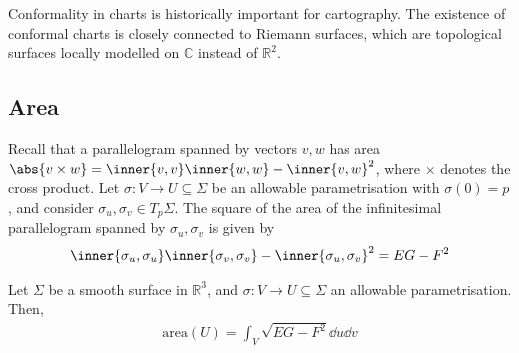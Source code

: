\begin{remark}
	Conformality in charts is historically important for cartography.
	The existence of conformal charts is closely connected to Riemann surfaces, which are topological surfaces locally modelled on $\mathbb C$ instead of $\mathbb R^2$.
\end{remark}

\subsection{Area}
Recall that a parallelogram spanned by vectors $v, w$ has area $\abs{v \times w} = \inner{v,v}\inner{w,w} - \inner{v,w}^2$, where $\times$ denotes the cross product.
Let $\sigma \colon V \to U \subseteq \Sigma$ be an allowable parametrisation with $\sigma(0) = p$, and consider $\sigma_u, \sigma_v \in T_p \Sigma$.
The square of the area of the infinitesimal parallelogram spanned by $\sigma_u, \sigma_v$ is given by
\begin{align*}
	\inner{\sigma_u, \sigma_u}\inner{\sigma_v, \sigma_v} - \inner{\sigma_u, \sigma_v}^2 = EG - F^2
\end{align*}
\begin{definition}
	Let $\Sigma$ be a smooth surface in $\mathbb R^3$, and $\sigma \colon V \to U \subseteq \Sigma$ an allowable parametrisation.
	Then,
	\begin{align*}
		\mathrm{area}(U) = \int_V \sqrt{EG - F^2} \dd{u}\dd{v}
	\end{align*}
\end{definition}

